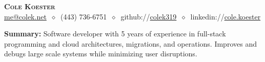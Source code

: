 \documentclass[letterpaper,11pt]{article}
\begin{document}
\begin{center}
\textbf{\LARGE\scshape Cole Koester} \\
\vspace{1pt}\small
\href{mailto:}{me@colek.net}
$\ \diamond\ $
(443) 736-6751
$\ \diamond\ $
github://\href{https://github.com/}{colek319}
$\ \diamond\ $
linkedin://\href{https://www.linkedin.com/}{cole.koester}
\end{center}

\noindent\begin{minipage}{\textwidth}
\footnotesize
\textbf{Summary:} Software developer with 5 years of experience in full-stack programming and cloud architectures, migrations, and operations. Improves and debugs large scale systems while minimizing user disruptions.
\end{minipage}
\end{document}
